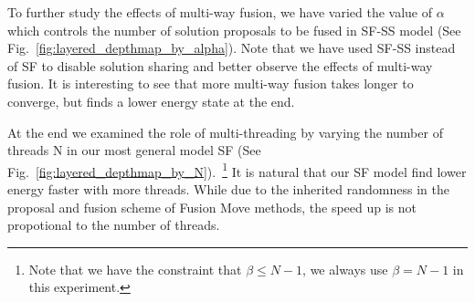 %
To further study the effects of multi-way fusion, we have varied the
value of $\alpha$ which controls the number of solution proposals to be
fused in SF-SS model (See
Fig.~\ref{fig:layered_depthmap_by_alpha}). Note that we have used SF-SS
instead of SF to disable solution sharing and better observe the effects
of multi-way fusion.
It is interesting to see that more multi-way fusion takes longer to
converge, but finds a lower energy state at the end.

At the end we examined the role of multi-threading by varying the number of threads N in our most general model SF (See Fig.~\ref{fig:layered_depthmap_by_N}).~\footnote{Note that we have the constraint that $\beta \leq N-1$, we always use $\beta = N-1$ in this experiment.}  It is natural that our SF model find lower energy faster with more threads. While due to the inherited randomness in the proposal and fusion scheme of Fusion Move methods, the speed up is not propotional to the number of threads.
